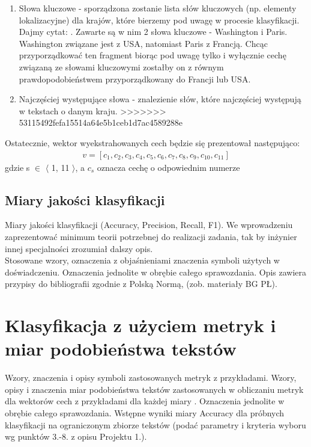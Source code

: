 \documentclass{classrep}
\begin{document}
\begin{enumerate}
    \item Słowa kluczowe - sporządzona zostanie lista słów kluczowych (np. elementy lokalizacyjne) dla krajów, które bierzemy pod uwagę w procesie klasyfikacji. Dajmy cytat: . Zawarte są w nim 2 słowa kluczowe - Washington i Paris. Washington związane jest z USA, natomiast Paris z Francją. Chcąc przyporządkować ten fragment biorąc pod uwagę tylko i wyłącznie cechę związaną ze słowami kluczowymi zostałby on z równym prawdopodobieństwem przyporządkowany do Francji lub USA.
    \item Najczęściej występujące słowa - znalezienie słów, które najczęściej występują w tekstach o danym kraju.
>>>>>>> 53115492fefa15514a64e5b1ceb1d7ac4589288e
\end{enumerate}
Ostatecznie, wektor wyekstrahowanych cech będzie się prezentował następująco: 
\begin{gather}
v = [c_{1}, c_{2}, c_{3}, c_{4}, c_{5}, c_{6}, c_{7}, c_{8}, c_{9}, c_{10}, c_{11}] 
\end{gather}
gdzie s $\in$ $\langle$ 1, 11 $\rangle$, a $c_{s}$ oznacza cechę o odpowiednim numerze \cite{tadeusiewicz90}

\subsection{Miary jakości klasyfikacji} 
Miary jakości klasyfikacji (Accuracy, Precision,
Recall, F1). We wprowadzeniu zaprezentować minimum teorii potrzebnej do realizacji
zadania, tak by inżynier innej specjalności zrozumiał dalszy opis.\\
\indent Stosowane wzory, oznaczenia z objaśnieniami znaczenia symboli użytych w
doświadczeniu. Oznaczenia jednolite w obrębie całego sprawozdania.  Opis zawiera przypisy do bibliografii zgodnie z
Polską Normą, (zob. materiały BG PŁ).\\


\section{Klasyfikacja z użyciem metryk i miar podobieństwa tekstów}
Wzory, znaczenia i opisy symboli zastosowanych metryk z
przykładami. Wzory, opisy i znaczenia miar
podobieństwa tekstów zastosowanych w obliczaniu metryk dla wektorów cech z
przykładami dla każdej miary \cite{niewiadomski08}.  Oznaczenia jednolite w obrębie całego sprawozdania.  Wstępne wyniki miary Accuracy dla próbnych klasyfikacji na ograniczonym zbiorze tekstów (podać parametry i kryteria
wyboru wg punktów 3.-8. z opisu Projektu 1.). \\ 
\end{document}
